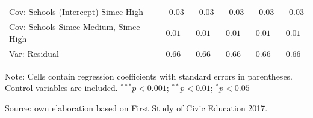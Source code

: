 \documentclass[
  12pt,
  letterpaper,
]{article}
\begin{document}
\begin{table}
{\begin{center}
{\begin{threeparttable}
\begin{tabular}{l c c c c c}
Cov: Schools (Intercept) Simce High       & $-0.03$       & $-0.03$       & $-0.03$       & $-0.03$       & $-0.03$       \\
Cov: Schools Simce Medium, Simce High     & $0.01$        & $0.01$        & $0.01$        & $0.01$        & $0.01$        \\
Var: Residual                             & $0.66$        & $0.66$        & $0.66$        & $0.66$        & $0.66$        \\
\bottomrule
\end{tabular}
\begin{tablenotes}[flushleft]
\scriptsize{\item Note: Cells contain regression coefficients with standard errors in parentheses. Control variables are included. $^{***}p<0.001$; $^{**}p<0.01$; $^{*}p<0.05$ \\ \item Source: own elaboration based on First Study of Civic Education 2017.}
\end{tablenotes}
\end{threeparttable}
}
\caption{}
\label{table:coefficients}
\end{center}

}

\end{table}%
\end{document}
